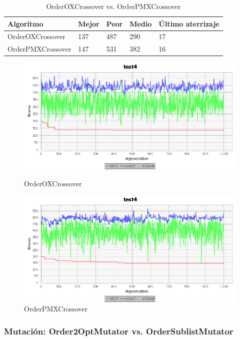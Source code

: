 \documentclass[a4paper,12pt,titlepage]{article}
\begin{document}
\begin{table}[!ht]
\centering
\begin{tabular}{@{}lllll@{}}
\toprule
Algoritmo         & Mejor & Peor & Medio & Último aterrizaje \\ \midrule
OrderOXCrossover  & 137   & 487  & 290   & 17                \\
OrderPMXCrossover & 147   & 531  & 382   & 16                \\ \bottomrule
\end{tabular}
\caption{OrderOXCrossover vs. OrderPMXCrossover}
\end{table}

\begin{figure}[!ht]
\centering
\begin{minipage}{.5\textwidth}
  \centering
  \includegraphics[width=\textwidth]{OrderOXCrossover.png}
  \caption{OrderOXCrossover}
\end{minipage}%
\begin{minipage}{.5\textwidth}
  \centering
  \includegraphics[width=\textwidth]{OrderPMXCrossover.png}
  \caption{OrderPMXCrossover}
\end{minipage}
\end{figure}

\subsubsection{Mutación: Order2OptMutator vs. OrderSublistMutator}
\end{document}
